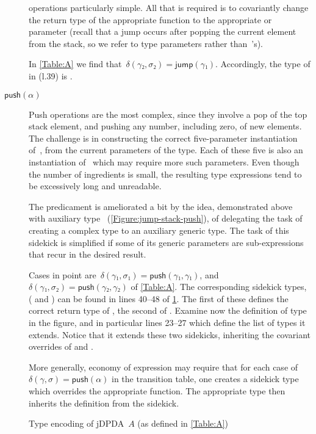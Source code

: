 \begin{description}
  operations particularly simple.
  All that is required is to covariantly change the return type of the
  appropriate  function to the appropriate  or~ parameter
  (recall that a jump occurs after popping the current element from the stack, so
  we refer to  type parameters rather than~'s).
  \par
  In \cref{Table:A} we find that~$δ(γ₂,σ₂) =\textsf{jump}(γ₁)$. Accordingly, the type of 
  in  (l.39) is .
  \item[$\textsf{push}(α)$]
  Push operations are the most complex, since they involve a pop of the top stack element,
  and pushing any number, including zero, of new elements.
  The challenge is in constructing the correct five-parameter instantiation of~,
  from the current parameters of the type.
  Each of these five is also an instantiation of~ which may require more such
  parameters.
  Even though the number of ingredients is small, the resulting type expressions
  tend to be excessively long and unreadable.
  \par
  The predicament is ameliorated a bit by the idea,
  demonstrated above with auxiliary type~
  (\cref{Figure:jump-stack-push}),
  of delegating the task of creating a complex type to an auxiliary
  generic type.
  The task of this sidekick is simplified if some of its generic
  parameters are sub-expressions that recur in the desired
  result.
  \par
  Cases in point
  are~$δ(γ₁,σ₁)=\textsf{push}(γ₁,γ₁)$, and~$δ(γ₁,σ₂)=\textsf{push}(γ₂,γ₂)$ of \cref{Table:A}.
  The corresponding sidekick types,
  ( and )
  can be found in lines 40--48 of \cref{Figure:A}.
  The first of these defines the correct return type
  of , the second of .
  Examine now the definition of type  in the figure,
  and in particular lines 23--27 which define the list of types it extends.
  Notice that it extends these two sidekicks, inheriting the covariant
  overrides of  and .
  \par
  More generally, economy of expression may require that for each case
    of~$δ(γ,σ)=\textsf{push}(α)$ in the transition table,
    one creates a sidekick type which
      overrides the appropriate  function.
  The appropriate  type then inherits the definition
    from the sidekick.
\end{description}

\begin{figure}[htbp]
  \caption{\label{Figure:A}Type encoding of jDPDA~$A$ (as defined in \cref{Table:A})}
\end{figure}
